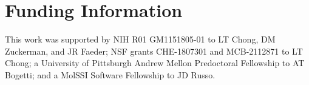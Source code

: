 \section{Funding Information}
This work was supported by NIH R01 GM1151805-01 to LT Chong, DM Zuckerman, and JR Faeder; NSF grants CHE-1807301 and MCB-2112871 to LT Chong; a University of Pittsburgh Andrew Mellon Predoctoral Fellowship to AT Bogetti; and a MolSSI Software Fellowship to JD Russo. 
